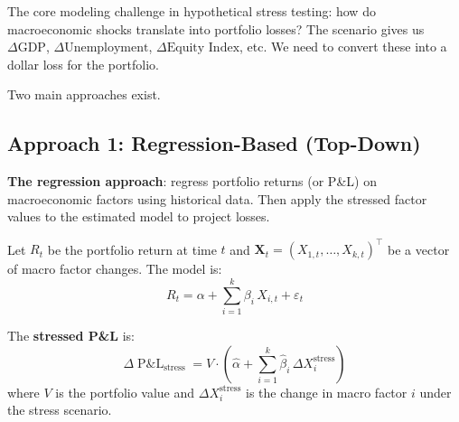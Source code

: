 \documentclass[11pt, a4paper]{article}
\theoremstyle{definition}
\theoremstyle{plain}
\theoremstyle{remark}
\newcommand{\PnL}{\operatorname{P\&L}}
\begin{document}
The core modeling challenge in hypothetical stress testing:
how do macroeconomic shocks translate into portfolio losses?
The scenario gives us $\Delta\text{GDP}$, $\Delta\text{Unemployment}$, $\Delta\text{Equity Index}$, etc.
We need to convert these into a dollar loss for the portfolio.

Two main approaches exist.

\subsection{Approach 1: Regression-Based (Top-Down)}

\begin{keyidea}
\textbf{The regression approach}: regress portfolio returns (or P\&L) on macroeconomic factors
using historical data.
Then apply the stressed factor values to the estimated model to project losses.

\medskip

Let $R_t$ be the portfolio return at time $t$ and $\bm{X}_t = (X_{1,t}, \ldots, X_{k,t})^\top$
be a vector of macro factor changes. The model is:
\[
    R_t = \alpha + \sum_{i=1}^{k} \beta_i \, X_{i,t} + \varepsilon_t
\]

The \textbf{stressed P\&L} is:
\[
    \Delta \PnL_{\text{stress}} = V \cdot \left(\hat\alpha + \sum_{i=1}^{k} \hat\beta_i \, \Delta X_{i}^{\text{stress}}\right)
\]
where $V$ is the portfolio value and $\Delta X_i^{\text{stress}}$ is the change in macro factor $i$
under the stress scenario.
\end{keyidea}
\end{document}

